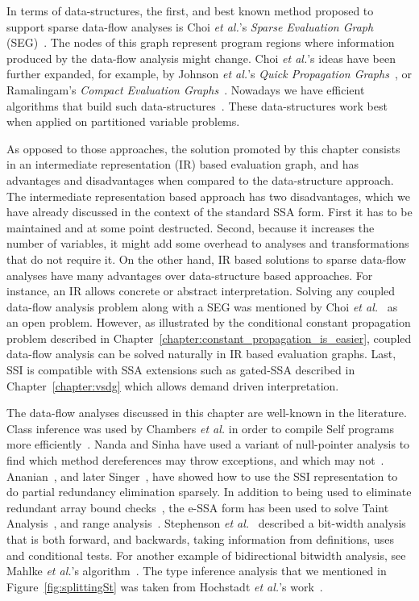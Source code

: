 {In terms of data-structures, the first, and best known method proposed to support sparse data-flow analyses is Choi {\em et al.}'s {\em Sparse Evaluation Graph} (SEG)~\cite{Choi91}.
The nodes of this graph represent program regions where information produced by the data-flow analysis might change.
Choi {\em et al.}'s ideas have been further expanded, for example, by Johnson {\em et al.}'s {\em Quick Propagation Graphs}~\cite{Johnson93}, or Ramalingam's {\em Compact Evaluation Graphs}~\cite{Ramalingam02}.
Nowadays we have efficient algorithms that build such data-structures~\cite{Pingali95,Pingali97,Johnson94}.
These data-structures work best when applied on partitioned variable problems.

As opposed to those approaches, the solution promoted by this chapter consists in an intermediate representation (IR) based evaluation graph, and has advantages and disadvantages when compared to the data-structure approach.
The intermediate representation based approach has two disadvantages, which we have already discussed in the context of the standard SSA form.
First it has to be maintained and at some point destructed.
Second, because it increases the number of variables, it might add some overhead to analyses and transformations that do not require it.
On the other hand, IR based solutions to sparse data-flow analyses have many advantages over data-structure based approaches.
For instance, an IR allows concrete or abstract interpretation.
Solving any coupled data-flow analysis problem along with a SEG was mentioned by Choi {\em et al.}~\cite{Choi91} as an open problem.
However, as illustrated by the conditional constant propagation problem described in Chapter~\ref{chapter:constant_propagation_is_easier}, coupled data-flow analysis can be solved naturally in IR based evaluation graphs.
Last, SSI is compatible with SSA extensions such as gated-SSA described in Chapter~\ref{chapter:vsdg} which allows demand driven interpretation.

The data-flow analyses discussed in this chapter are well-known in the literature.
Class inference was used by Chambers {\em et al.} in order to compile Self programs more efficiently~\cite{Chambers89}.
Nanda and Sinha have used a variant of null-pointer analysis to find which method dereferences may throw exceptions, and which may not~\cite{Nanda09}.
Ananian~\cite{Ananian99}, and later Singer~\cite{Singer06}, have showed how to use the SSI representation to do partial redundancy elimination sparsely.
In addition to being used to eliminate redundant array bound checks~\cite{Bodik00}, the e-SSA form has been used to solve Taint Analysis~\cite{Rimsa11}, and range analysis~\cite{Su05,Gawlitza09}.
Stephenson {\em et al.}~\cite{Stephenson00} described a bit-width analysis that is both forward, and backwards, taking information from definitions, uses and conditional tests.
For another example of bidirectional bitwidth analysis, see Mahlke {\em et al.}'s algorithm~\cite{Mahlke01}.
The type inference analysis that we mentioned in Figure~\ref{fig:splittingSt} was taken from Hochstadt {\em et al.}'s work~\cite{Hochstadt08}.

}
